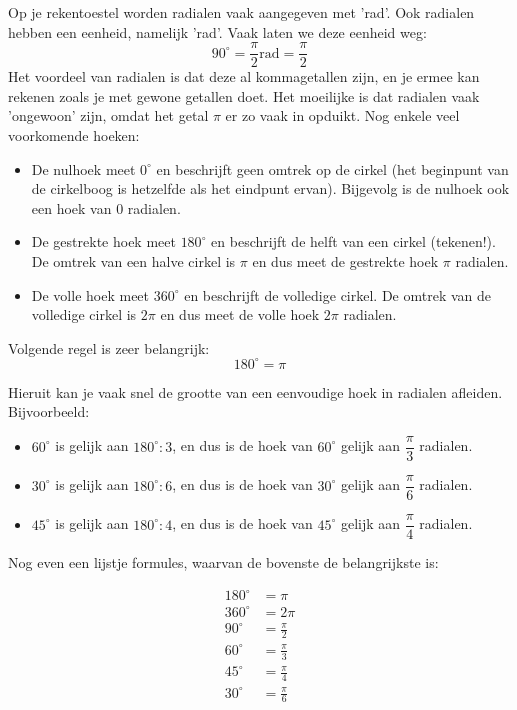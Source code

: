 Op je rekentoestel worden radialen vaak aangegeven met 'rad'. Ook radialen hebben een eenheid, namelijk 'rad'. Vaak laten we deze eenheid weg:
\[90^\circ = \frac{\pi}{2} \text{rad}=\frac{\pi}{2}\]
Het voordeel van radialen is dat deze al kommagetallen zijn, en je ermee kan rekenen zoals je met gewone getallen doet. Het moeilijke is dat radialen vaak 'ongewoon' zijn, omdat het getal $\pi$ er zo vaak in opduikt.  Nog enkele veel voorkomende hoeken:
\begin{itemize}
	\item De nulhoek meet $0^\circ$ en beschrijft geen omtrek op de cirkel (het beginpunt van de cirkelboog is hetzelfde als het eindpunt ervan). Bijgevolg is de nulhoek ook een hoek van $0$ radialen.
	\item De gestrekte hoek meet $180^\circ$ en beschrijft de helft van een cirkel (tekenen!). De omtrek van een halve cirkel is $\pi$ en dus meet de gestrekte hoek $\pi$ radialen.
	\item De volle hoek meet $360^\circ$ en beschrijft de volledige cirkel. De omtrek van de volledige cirkel is $2\pi$ en dus meet de volle hoek $2\pi$ radialen.
\end{itemize}

Volgende regel is zeer belangrijk:
\[180^\circ=\pi\]

Hieruit kan je vaak snel de grootte van een eenvoudige hoek in radialen afleiden. Bijvoorbeeld:
\begin{itemize}
	\item $60^\circ$ is gelijk aan $180^\circ:3$, en dus is de hoek van $60^\circ$ gelijk aan $\dfrac{\pi}{3}$ radialen.
	\item $30^\circ$ is gelijk aan $180^\circ:6$, en dus is de hoek van $30^\circ$ gelijk aan $\dfrac{\pi}{6}$ radialen.
	\item $45^\circ$ is gelijk aan $180^\circ:4$, en dus is de hoek van $45^\circ$ gelijk aan $\dfrac{\pi}{4}$ radialen.
\end{itemize}

Nog even een lijstje formules, waarvan de bovenste de belangrijkste is:

\begin{align*}
180^\circ&=\pi\\
360^\circ&=2\pi\\
90^\circ&=\frac{\pi}{2}\\
60^\circ&=\frac{\pi}{3}\\
45^\circ&=\frac{\pi}{4}\\
30^\circ&=\frac{\pi}{6}
\end{align*}

